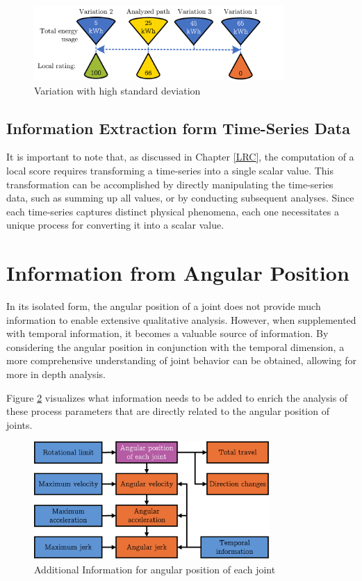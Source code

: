 \begin{figure}[H]
	\centerline{\includegraphics[width=0.85\textwidth]{figures/highstd.png}}
	\caption{Variation with high standard deviation}
	\label{highstd}
\end{figure}

 
\subsection{Information Extraction form Time-Series Data}\label{extraction}
It is important to note that, as discussed in Chapter \ref{LRC}, the computation of a local score requires transforming a time-series into a single scalar value. This transformation can be accomplished by directly manipulating the time-series data, such as summing up all values, or by conducting subsequent analyses. Since each time-series captures distinct physical phenomena, each one necessitates a unique process for converting it into a scalar value.




\newpage
\section{Information from Angular Position}
In its isolated form, the angular position of a joint does not provide much information to enable extensive qualitative analysis. However, when supplemented with temporal information, it becomes a valuable source of information. By considering the angular position in conjunction with the temporal dimension, a more comprehensive understanding of joint behavior can be obtained, allowing for more in depth analysis.



Figure \ref{agularstuff} visualizes what information needs to be added to enrich the analysis of these process parameters that are directly related to the angular position of joints.

\begin{figure}[H]
	\centerline{\includegraphics[width=0.8\textwidth]{figures/angularstuff.png}}
	\caption{Additional Information for angular position of each joint}
	\label{agularstuff}
\end{figure}



